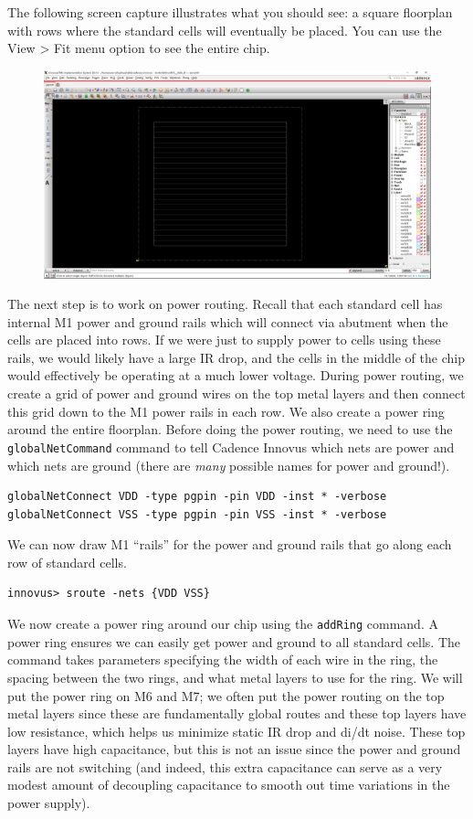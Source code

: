 \documentclass[a4paper,12pt,twoside]{article}
\begin{document}
The following screen capture illustrates what you should see: a square floorplan with rows where the standard cells will eventually be placed. You can use the View > Fit menu option to see the entire chip.
\begin{figure}[H]
    \centering
    \includegraphics[width=\textwidth]{images/11.png}
\end{figure}
The next step is to work on power routing. Recall that each standard cell has internal M1 power and ground rails which will connect via abutment when the cells are placed into rows. If we were just to supply power to cells using these rails, we would likely have a large IR drop, and the cells in the middle of the chip would effectively be operating at a much lower voltage. During power routing, we create a grid of power and ground wires on the top metal layers and then connect this grid down to the M1 power rails in each row. We also create a power ring around the entire floorplan. Before doing the power routing, we need to use the \texttt{globalNetCommand} command to tell Cadence Innovus which nets are power and which nets are ground (there are \textit{many} possible names for power and ground!).
\begin{verbatim}
globalNetConnect VDD -type pgpin -pin VDD -inst * -verbose
globalNetConnect VSS -type pgpin -pin VSS -inst * -verbose
\end{verbatim}
We can now draw M1 “rails” for the power and ground rails that go along each row of standard cells.
\begin{verbatim}
innovus> sroute -nets {VDD VSS}
\end{verbatim}
We now create a power ring around our chip using the \texttt{addRing} command. A power ring ensures we can easily get power and ground to all standard cells. The command takes parameters specifying the width of each wire in the ring, the spacing between the two rings, and what metal layers to use for the ring. We will put the power ring on M6 and M7; we often put the power routing on the top metal layers since these are fundamentally global routes and these top layers have low resistance, which helps us minimize static IR drop and di/dt noise. These top layers have high capacitance, but this is not an issue since the power and ground rails are not switching (and indeed, this extra capacitance can serve as a very modest amount of decoupling capacitance to smooth out time variations in the power supply).
\end{document}

